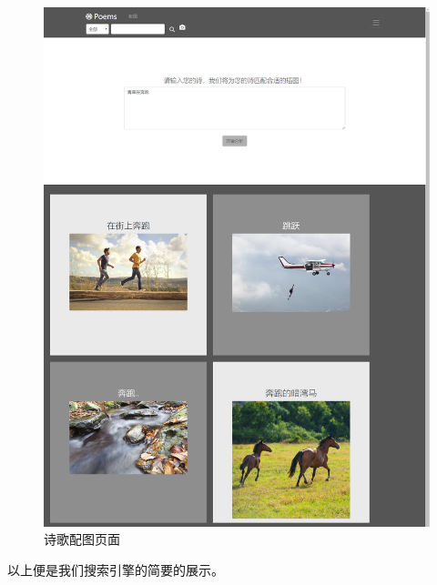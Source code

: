 \documentclass[a4paper, 10pt]{article}
\begin{document}
\begin{figure}[H]
\centering
\includegraphics[scale=0.48]{fig/demo_matchimage.png}
\caption{诗歌配图页面}
\label{fig:demo_matchimage}
\end{figure}

以上便是我们搜索引擎的简要的展示。
\end{document}
